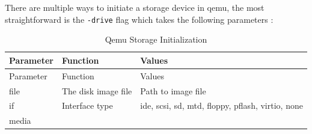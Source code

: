 \documentclass[
  14pt,
  english,
  a4paper,
]{scrreprt}
\begin{document}
There are multiple ways to initiate a storage device in qemu, the most
straightforward is the \texttt{-drive} flag which takes the following
parameters :

\hypertarget{tbl:qemu_sto_decl}{}
\begin{longtable}[]{@{}lll@{}}
\caption{\label{tbl:qemu_sto_decl}Qemu Storage
Initialization}\tabularnewline
\toprule
\begin{minipage}[b]{0.13\columnwidth}\raggedright
Parameter\strut
\end{minipage} & \begin{minipage}[b]{0.24\columnwidth}\raggedright
Function\strut
\end{minipage} & \begin{minipage}[b]{0.55\columnwidth}\raggedright
Values\strut
\end{minipage}\tabularnewline
\midrule
\endfirsthead
\toprule
\begin{minipage}[b]{0.13\columnwidth}\raggedright
Parameter\strut
\end{minipage} & \begin{minipage}[b]{0.24\columnwidth}\raggedright
Function\strut
\end{minipage} & \begin{minipage}[b]{0.55\columnwidth}\raggedright
Values\strut
\end{minipage}\tabularnewline
\midrule
\endhead
\begin{minipage}[t]{0.13\columnwidth}\raggedright
file\strut
\end{minipage} & \begin{minipage}[t]{0.24\columnwidth}\raggedright
The disk image file\strut
\end{minipage} & \begin{minipage}[t]{0.55\columnwidth}\raggedright
Path to image file\strut
\end{minipage}\tabularnewline
\begin{minipage}[t]{0.13\columnwidth}\raggedright
if\strut
\end{minipage} & \begin{minipage}[t]{0.24\columnwidth}\raggedright
Interface type\strut
\end{minipage} & \begin{minipage}[t]{0.55\columnwidth}\raggedright
ide, scsi, sd, mtd, floppy, pflash, virtio, none\strut
\end{minipage}\tabularnewline
\begin{minipage}[t]{0.13\columnwidth}\raggedright
media\strut
\end{minipage} & \begin{minipage}[t]{0.24\columnwidth}\raggedright

\end{minipage}
\end{longtable}
\end{document}

